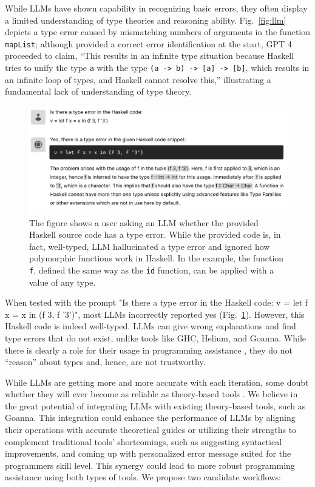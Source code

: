 \documentclass[pdflatex,sn-nature,Numbered]{sn-jnl}%
\begin{document}
While LLMs have shown capability in recognizing basic errors, they often display a limited understanding of type theories and reasoning ability. Fig.~\ref{fig:llm} depicts a type error caused by mismatching numbers of arguments in the function \texttt{mapList}; although provided a correct error identification at the start, GPT 4 proceeded to claim, “This results in an infinite type situation because Haskell tries to unify the type \texttt{a} with the type \texttt{(a -> b) -> [a] -> [b]}, which results in an infinite loop of types, and Haskell cannot resolve this,” illustrating a fundamental lack of understanding of type theory.

\begin{figure}[hbt]
  \includegraphics[width=\linewidth]{images/LLM2.pdf}
  \caption[An example where LLM identified a type error in well-typed source code]{\label{fig:llm2}
  The figure shows a user asking an LLM whether the provided Haskell source code has a type error. While the provided code is, in fact, well-typed, LLM hallucinated a type error and ignored how polymorphic functions work in Haskell. In the example, the function \texttt{f},  defined the same way as the \texttt{id} function, can be applied with a value of any type.
    } 
\end{figure}

When tested with the prompt "Is there a type error in the Haskell code: v = let f x = x in (f 3, f '3')", most LLMs incorrectly reported yes (Fig.~\ref{fig:llm2}). However, this Haskell code is indeed well-typed. LLMs can give wrong explanations and find type errors that do not exist, unlike tools like GHC, Helium, and Goanna. While there is clearly a role for their usage in programming assistance \cite{Lee2024-hs}, they do not “reason” about types and, hence, are not trustworthy.

While LLMs are getting more and more accurate with each iteration, some doubt whether they will ever become as reliable as theory-based tools \cite{Berglund2023-ig}. We believe in the great potential of integrating LLMs with existing theory-based tools, such as Goanna. This integration could enhance the performance of LLMs by aligning their operations with accurate theoretical guides or utilizing their strengths to complement traditional tools' shortcomings, such as suggesting syntactical improvements, and coming up with personalized error message suited for the programmers skill level. This synergy could lead to more robust programming assistance using both types of tools. We propose two candidate workflows:
\end{document}

